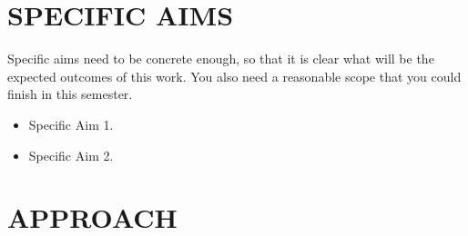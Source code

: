 \documentclass[letterpaper, 10 pt, conference]{ieeeconf}  %
\begin{document}
\section{SPECIFIC AIMS}

Specific aims need to be concrete enough, so that it is clear what will be the expected outcomes of this work. You also need a reasonable scope that you could finish in this semester.

\begin{itemize}
\item Specific Aim 1.
\item Specific Aim 2.
\end{itemize}

\section{APPROACH}
\end{document}
